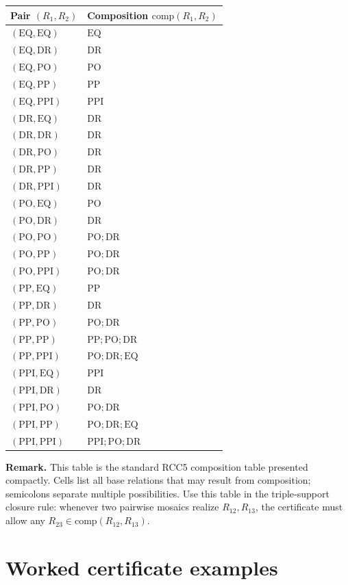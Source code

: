 \documentclass[11pt]{article}
\newcommand{\PP}{\mathrm{PP}}
\newcommand{\PPI}{\mathrm{PPI}}
\newcommand{\EQ}{\mathrm{EQ}}
\newcommand{\DR}{\mathrm{DR}}
\newcommand{\PO}{\mathrm{PO}}
\begin{document}
\begin{center}
\begin{tabular}{l|l}
\textbf{Pair $(R_1,R_2)$} & \textbf{Composition $\mathrm{comp}(R_1,R_2)$} \\
\hline
$(\EQ,\EQ)$ & $\EQ$ \\
$(\EQ,\DR)$ & $\DR$ \\
$(\EQ,\PO)$ & $\PO$ \\
$(\EQ,\PP)$ & $\PP$ \\
$(\EQ,\PPI)$ & $\PPI$ \\
\hline
$(\DR,\EQ)$ & $\DR$ \\
$(\DR,\DR)$ & $\DR$ \\
$(\DR,\PO)$ & $\DR$ \\
$(\DR,\PP)$ & $\DR$ \\
$(\DR,\PPI)$ & $\DR$ \\
\hline
$(\PO,\EQ)$ & $\PO$ \\
$(\PO,\DR)$ & $\DR$ \\
$(\PO,\PO)$ & $\PO;\DR$ \\
$(\PO,\PP)$ & $\PO;\DR$ \\
$(\PO,\PPI)$ & $\PO;\DR$ \\
\hline
$(\PP,\EQ)$ & $\PP$ \\
$(\PP,\DR)$ & $\DR$ \\
$(\PP,\PO)$ & $\PO;\DR$ \\
$(\PP,\PP)$ & $\PP;\PO;\DR$ \\
$(\PP,\PPI)$ & $\PO;\DR;\EQ$ \\
\hline
$(\PPI,\EQ)$ & $\PPI$ \\
$(\PPI,\DR)$ & $\DR$ \\
$(\PPI,\PO)$ & $\PO;\DR$ \\
$(\PPI,\PP)$ & $\PO;\DR;\EQ$ \\
$(\PPI,\PPI)$ & $\PPI;\PO;\DR$ \\
\end{tabular}
\end{center}

\noindent\textbf{Remark.} This table is the standard RCC5 composition table
presented compactly. Cells list all base relations that may result from
composition; semicolons separate multiple possibilities. Use this table in
the triple‑support closure rule: whenever two pairwise mosaics realize
$R_{12},R_{13}$, the certificate must allow any $R_{23}\in\mathrm{comp}(R_{12},R_{13})$.

\section{Worked certificate examples}
\label{app:worked-examples}
\end{document}
